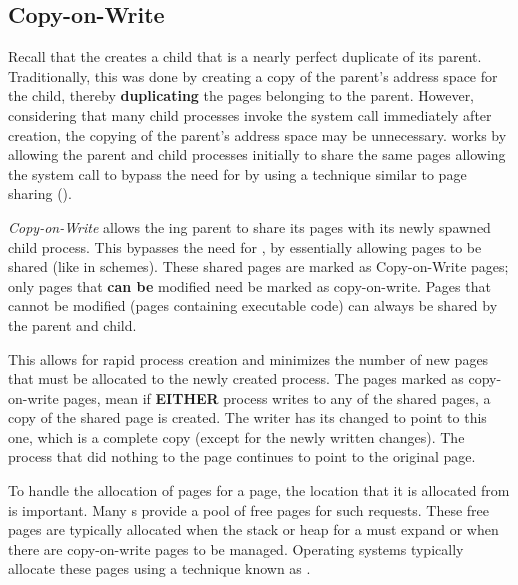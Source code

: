 \subsection{Copy-on-Write}\label{subsec:Memory_Copy_on_Write}
Recall that the   creates a child  that is a nearly perfect duplicate of its parent.
Traditionally, this was done by creating a copy of the parent’s address space for the child, thereby \textbf{duplicating} the pages belonging to the parent.
However, considering that many child processes invoke the  system call immediately after creation, the copying of the parent’s address space may be unnecessary.
 works by allowing the parent and child processes initially to share the same pages allowing the  system call to bypass the need for  by using a technique similar to page sharing ().

\begin{definition}\label{def:Memory_Copy_on_Write}
  \emph{Copy-on-Write} allows the ing parent  to share its pages with its newly spawned child process.
  This bypasses the need for , by essentially allowing pages to be shared (like in  schemes).
  These shared pages are marked as Copy-on-Write pages; only pages that \textbf{can be} modified need be marked as copy-on-write.
  Pages that cannot be modified (pages containing executable code) can always be shared by the parent and child.

  This allows for rapid process creation and minimizes the number of new pages that must be allocated to the newly created process.
  The pages marked as copy-on-write pages, mean if \textbf{EITHER} process writes to any of the shared pages, a copy of the shared page is created.
  The writer has its  changed to point to this one, which is a complete copy (except for the newly written changes).
  The process that did nothing to the page continues to point to the original page.
\end{definition}

To handle the allocation of pages for a  page, the location that it is allocated from is important.
Many s provide a pool of free pages for such requests.
These free pages are typically allocated when the stack or heap for a  must expand or when there are copy-on-write pages to be managed.
Operating systems typically allocate these pages using a technique known as .


